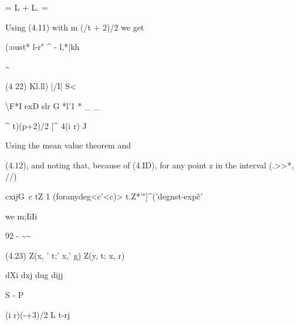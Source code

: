 = L + L. =

\begin{ocrformula}
Using     (4.11) with m                 (/t +         2)/2    we get
\end{ocrformula}

\begin{ocrformula}
(:oust* l-r" ^         - l,*|kh
\end{ocrformula}

\textasciitilde{}

\begin{ocrformula}
(4 22)
Kl.ll)                      |/I| S<
\end{ocrformula}

\textbackslash{}F*I exD slr G *l'1 * \_ \_

\begin{ocrformula}
^     t)(p+2)/2     [^ 4(i      r) J
\end{ocrformula}

Using the mean value theorem and

\begin{ocrformula}
(4.12), and                                 noting      that, because      of
(4.ID), for any            point z in the interval (.>>*,
//)
\end{ocrformula}

\begin{ocrformula}
cxijG~c                                                                     tZ           1          (foranydeg<c'<c)>
t.Z*'"]^('degnst-exp\~c'
\end{ocrformula}

we m;IiIi

92 - \textasciitilde{}\textasciitilde{}

\begin{ocrformula}
(4.23)                     Z(x, ' t;' x,' g)                  Z(y, t; x, r)
\end{ocrformula}

dXi dxj dug dijj

\begin{ocrformula}
const. \x -y\                          G              -
\y    {[P
\end{ocrformula}

S - P

\begin{ocrformula}
(i    r)(-+3)/2                        L            t-rj
\end{ocrformula}

